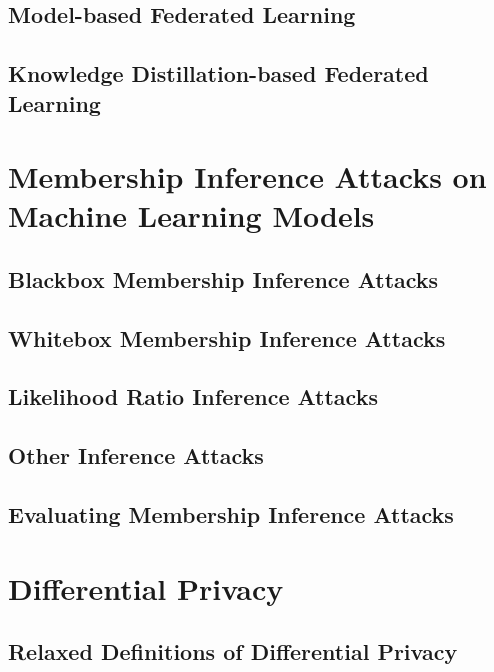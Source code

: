 \subsection{Model-based Federated Learning}
\label{sec:mbfl}

\subsection{Knowledge Distillation-based Federated Learning}
\label{sec:kdfl}




\section{Membership Inference Attacks on Machine Learning Models}
\label{sec:mia}

\subsection{Blackbox Membership Inference Attacks}
\label{sec:blackboxmia}

\subsection{Whitebox Membership Inference Attacks}
\label{sec:whiteboxmia}

\subsection{Likelihood Ratio Inference Attacks}
\label{sec:lira}


\subsection{Other Inference Attacks}
\label{sec:othermia}

\subsection{Evaluating Membership Inference Attacks}
\label{sec:evalmia}



\section{Differential Privacy}
\label{sec:dp}

\subsection{Relaxed Definitions of Differential Privacy}
\label{sec:relaxeddp}




